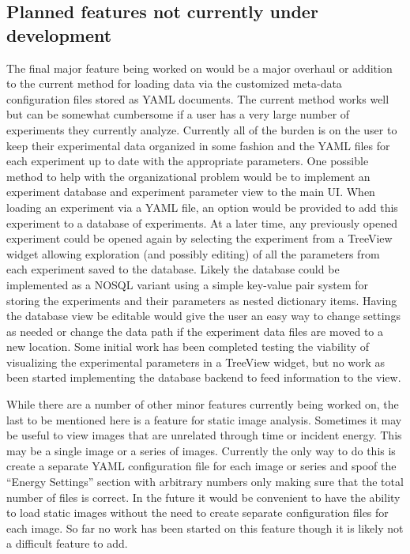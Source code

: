 \subsection{Planned features not currently under development}
The final major feature being worked on would be a major overhaul or addition to the current method for loading data via the customized meta-data configuration files stored as YAML documents. The current method works well but can be somewhat cumbersome if a user has a very large number of experiments they currently analyze. Currently all of the burden is on the user to keep their experimental data organized in some fashion and the YAML files for each experiment up to date with the appropriate parameters. One possible method to help with the organizational problem would be to implement an experiment database and experiment parameter view to the main UI. When loading an experiment via a YAML file, an option would be provided to add this experiment to a database of experiments. At a later time, any previously opened experiment could be opened again by selecting the experiment from a TreeView widget allowing exploration (and possibly editing) of all the parameters from each experiment saved to the database. Likely the database could be implemented as a NOSQL variant using a simple key-value pair system for storing the experiments and their parameters as nested dictionary items. Having the database view be editable would give the user an easy way to change settings as needed or change the data path if the experiment data files are moved to a new location. Some initial work has been completed testing the viability of visualizing the experimental parameters in a TreeView widget, but no work as been started implementing the database backend to feed information to the view.

While there are a number of other minor features currently being worked on, the last to be mentioned here is a feature for static image analysis. Sometimes it may be useful to view images that are unrelated through time or incident energy. This may be a single image or a series of images. Currently the only way to do this is create a separate YAML configuration file for each image or series and spoof the ``Energy Settings'' section with arbitrary numbers only making sure that the total number of files is correct. In the future it would be convenient to have the ability to load static images without the need to create separate configuration files for each image. So far no work has been started on this feature though it is likely not a difficult feature to add.


